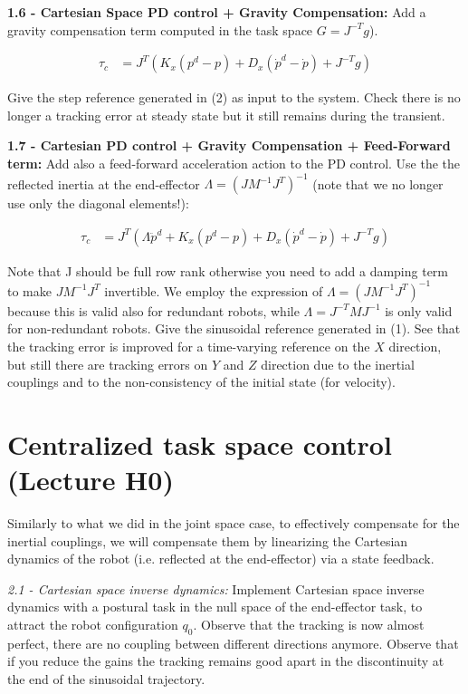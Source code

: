 \documentclass[11pt]{article}
\begin{document}
\quad

\noindent
\textbf{1.6 - Cartesian Space PD control + Gravity Compensation:}
Add a gravity compensation term computed in the task space $G= J^{-T}g$).

\begin{align}
\tau_c & = J^T\left( K_x(p^d - p) + D_x(\dot{p}^d -\dot{p})  + J^{-T}g \right)
\end{align}

Give the step reference generated in (2) as input to the system. 
Check there is no longer a  tracking error at steady state but  it still remains during the transient. 

\quad

\noindent
\textbf{1.7 - Cartesian PD control  + Gravity Compensation + Feed-Forward term:}
Add also a feed-forward acceleration action to the PD control. Use the the reflected inertia
at the end-effector $\Lambda = (J M^{-1} J^T)^{-1}$ (note that we no longer use only the diagonal elements!):

\begin{align}
\tau_c & = J^T\left( \Lambda \ddot{p}^d + K_x(p^d - p) + D_x(\dot{p}^d -\dot{p})  + J^{-T}g \right)
\end{align}

Note that J should be full row rank  otherwise you need to add a damping term to make $JM^{-1}J^T$ invertible.
We employ the expression of $\Lambda = (JM^{-1}J^T)^{-1}$ because this is valid also for redundant robots, while $\Lambda = J^{-T}M J^{-1}$ is only  valid for non-redundant robots. 
Give the sinusoidal reference generated in (1). See that the tracking error is improved for a time-varying reference on the $X$ direction, but still there are tracking errors on $Y$ and $Z$ direction due to the inertial couplings and to the non-consistency of the initial state (for velocity).

\section{Centralized task space control (Lecture H0)}

Similarly to what we did in the joint space case, to effectively compensate for the inertial couplings, we will compensate them by linearizing the Cartesian dynamics of the robot (i.e. reflected at the end-effector) via a state feedback.

\quad

\noindent
\textit{2.1 - Cartesian space inverse dynamics:}
Implement Cartesian space inverse dynamics with a postural task in the null space of the end-effector task, to attract the robot configuration $q_0$. Observe that the tracking is now almost perfect, there are no coupling between different directions anymore.  Observe that if you reduce the gains the tracking remains good apart in the discontinuity at the end of the sinusoidal trajectory.  
\end{document}
